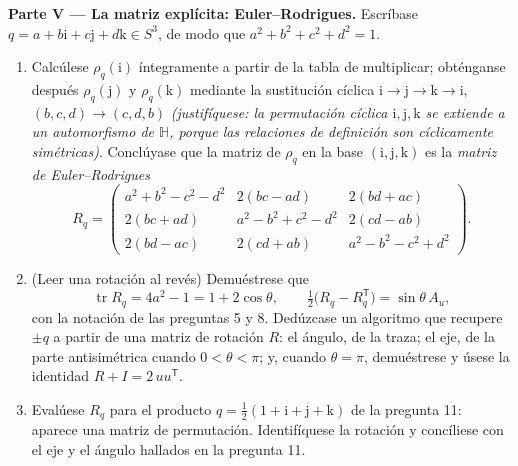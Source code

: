 \begin{problem}
\medskip
\noindent\textbf{Parte V --- La matriz explícita: Euler--Rodrigues.}
Escríbase $q = a + b\mathrm i + c\mathrm j +
d\mathrm k \in S^3$, de modo que $a^2 + b^2 + c^2 + d^2 = 1$.
\begin{enumerate}[resume]
  \item Calcúlese $\rho_q(\mathrm i)$ íntegramente a partir de la tabla
  de multiplicar; obténganse después $\rho_q(\mathrm
        j)$ y $\rho_q(\mathrm k)$ mediante la sustitución cíclica
  $\mathrm i \to \mathrm j \to \mathrm k
        \to \mathrm i$, $(b, c, d) \to (c, d, b)$ \emph{(justifíquese:
  la permutación cíclica $\mathrm i, \mathrm j,
        \mathrm k$ se extiende a un automorfismo de $\mathbb
        H$, porque las relaciones de definición son cíclicamente
  simétricas)}. Conclúyase que la matriz de $\rho_q$ en la base
  $(\mathrm i, \mathrm j, \mathrm k)$ es la \emph{matriz de
  Euler--Rodrigues}
        \[
        R_q = \begin{pmatrix}
        a^2 + b^2 - c^2 - d^2 & 2(bc - ad) & 2(bd + ac)\\
        2(bc + ad) & a^2 - b^2 + c^2 - d^2 & 2(cd - ab)\\
        2(bd - ac) & 2(cd + ab) & a^2 - b^2 - c^2 + d^2
        \end{pmatrix}.
        \]
  \item (Leer una rotación al revés) Demuéstrese que
        \[
        \operatorname{tr}R_q = 4a^2 - 1 = 1 + 2\cos\theta,
        \qquad
        \tfrac12\bigl(R_q - R_q^{\mathsf T}\bigr) =
        \sin\theta\,A_u,
        \]
        con la notación de las preguntas 5 y 8. Dedúzcase un algoritmo
        que recupere $\pm q$ a partir de una matriz de rotación $R$: el
        ángulo, de la traza; el eje, de la parte antisimétrica cuando
        $0 < \theta < \pi$; y, cuando $\theta = \pi$, demuéstrese y
        úsese la identidad $R
        + I = 2\,uu^{\mathsf T}$. \item Evalúese $R_q$ para el producto
        $q =
        \frac12(1 + \mathrm i + \mathrm j + \mathrm k)$ de la pregunta
        11: aparece una matriz de permutación. Identifíquese la rotación
        y concíliese con el eje y el ángulo hallados en la pregunta 11.
\end{enumerate}


\end{problem}
